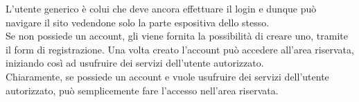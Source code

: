 L'utente generico è colui che deve ancora effettuare il login e dunque può navigare il sito vedendone solo la parte espositiva dello stesso.\\
Se non possiede un account, gli viene fornita la possibilità di creare uno, tramite il form di registrazione. Una volta creato l'account può accedere all'area riservata, iniziando così ad usufruire dei servizi dell'utente autorizzato.\\
Chiaramente, se possiede un account e vuole usufruire dei servizi dell'utente autorizzato, può semplicemente fare l'accesso nell'area riservata. 
